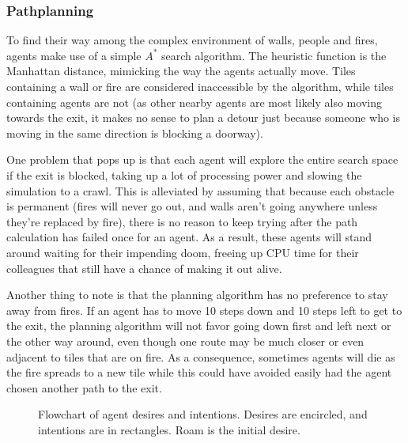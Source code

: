 \documentclass[a4paper]{article}
\begin{document}
\subsubsection{Pathplanning}
To find their way among the complex environment of walls, people and fires,
agents make use of a simple $A^*$ search algorithm. The
heuristic function is the Manhattan distance, mimicking the way the agents
actually move. Tiles containing a wall or fire are considered inaccessible
by the algorithm, while tiles containing agents are not (as other nearby
agents are most likely also moving towards the exit, it makes no sense to plan
a detour just because someone who is moving in the same direction is blocking a
doorway).

One problem that pops up is that each agent will explore the entire
search space if the exit is blocked, taking up a lot of processing power and
slowing the simulation to a crawl. This is alleviated by assuming that because
each obstacle is permanent (fires will never go out, and walls aren't going
anywhere unless they're replaced by fire), there is no reason to keep trying
after the path calculation has failed once for an agent. As a result, these
agents will stand around waiting for their impending doom, freeing up CPU time
for their colleagues that still have a chance of making it out alive.

Another thing to note is that the planning algorithm has no preference to stay away from fires. If an agent has to move 10 steps down and 10 steps left to get to the exit, the planning algorithm will not favor going down first and left next or the other way around, even though one route may be much closer or even adjacent to tiles that are on fire. As a consequence, sometimes agents will die as the fire spreads to a new tile while this could have avoided easily had the agent chosen another path to the exit.

\begin{figure}[!ht]
  \centering

\captionsetup{justification=centering,margin=1cm}
\caption{Flowchart of agent desires and intentions. Desires are encircled, and intentions are in rectangles. Roam is the initial desire.}
\label{tikz:flow}
\end{figure}
\end{document}
